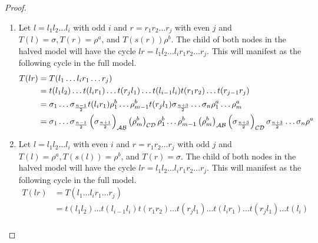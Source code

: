 \begin{proof} \phantom{x}
    \begin{enumerate}
        \item Let $l = l_1l_2 \dots l_i$ with odd $i$ and $r = r_1r_2 \dots r_j$ with even $j$ and $T(l) = \sigma, T(r) = \rho^a$, and $T(s(r))\rho^b$.
              The child of both nodes in the halved model will have the cycle $lr = l_1l_2 \dots l_i r_1r_2 \dots r_j$.
              This will manifest as the following cycle in the full model.
              \begin{align*}
                  T(lr) & = T(l_1 \dots l_i r_1 \dots r_j)                                                      \\
                        & =
                  t(l_1l_2) \dots t(l_i r_1) \dots t(r_j l_1) \dots t(l_{i-1}l_i) t(r_1r_2) \dots t(r_{j-1}r_j) \\
                        & =
                  \sigma_1 \dots \sigma_{\frac{n-1}{2}} t(l_i r_1)
                  \rho^b_1 \dots \rho^b_{m-1} t(r_j l_1)
                  \sigma_{\frac{n+3}{2}} \dots \sigma_n
                  \rho^a_1 \dots \rho^a_m                                                                       \\
                        & =
                  \sigma_1 \dots \sigma_{\frac{n-1}{2}} \left(\sigma_{\frac{n+1}{2}}\right)_{\mathcal{A}\mathcal{B}} \left(\rho^b_m\right)_{\mathcal{C}\mathcal{D}}
                  \rho^b_1 \dots \rho^b_{m-1} \left(\rho^b_m\right)_{\mathcal{A}\mathcal{B}} \left(\sigma_{\frac{n+3}{2}}\right)_{\mathcal{C}\mathcal{D}}
                  \sigma_{\frac{n+3}{2}} \dots \sigma_n
                  \rho^a                                                                                        \\
              \end{align*}
        \item Let $l = l_1l_2 \dots l_i$ with even $i$ and $r = r_1r_2 \dots r_j$ with odd $j$ and $T(l) = \rho^a, T(s(l)) = \rho^b$, and $T(r) = \sigma$.
              The child of both nodes in the halved model will have the cycle $lr = l_1l_2 \dots l_i r_1r_2 \dots r_j$.
              This will manifest as the following cycle in the full model.
              \begin{align*}
                  T(lr) & = T(l_1 \dots l_i r_1 \dots r_j)                                                              \\
                        & =
                  t(l_1l_2) \dots t(l_{i-1}l_i) t(r_1r_2) \dots t(r_j l_1) \dots t(l_ir_1) \dots t(r_jl_1) \dots t(l_i) \\

\end{align*}
\end{enumerate}
\end{proof}
